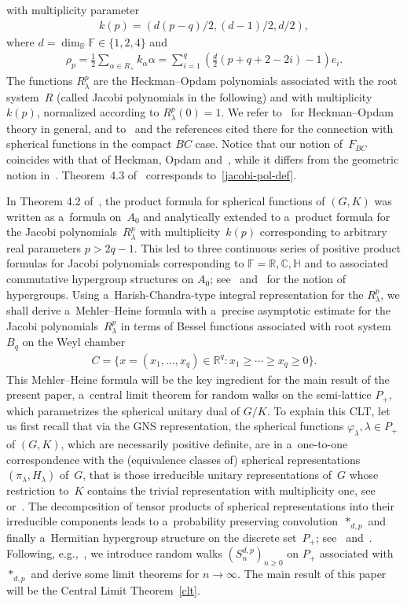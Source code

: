 with multiplicity parameter
\begin{gather}
\label{multipl}
k(p)=(d(p-q)/2, (d-1)/2, d/2),
\end{gather}
where $d=\dim_\mathbb R \mathbb F \in \{1,2,4\}$ and
\begin{gather*}
\rho_p=\frac{1}{2}\sum\limits_{\alpha\in R_+} k_\alpha\alpha=\sum\limits_{i=1}^q \left(\frac{d}{2}(p+q+2-2i) -1\right)e_i.
\end{gather*}
The functions $R_\lambda^p$ are the Heckman--Opdam polynomials associated with the root system~$R$ (called Jacobi
polynomials in the following) and with multiplicity $k(p)$, normalized according to $R_\lambda^p(0)=1$.
We refer to~\cite{H,HS,O1} for Heckman--Opdam theory in general, and to~\cite{RR} and the references
cited there for the connection with spherical functions in the compact $BC$ case.
Notice that our notion of~$F_{BC}$ coincides with that of Heckman, Opdam and~\cite{R2,RV2}, while it dif\/fers
from the geometric notion in~\cite{RR}.
Theorem~4.3 of~\cite{RR} corresponds to~\eqref{jacobi-pol-def}.

In Theorem 4.2 of~\cite{RR}, the product formula for spherical functions of $(G,K)$ was written as a~formula on~$A_0$
and analytically extended to a~product formula for the Jacobi polyno\-mials~$R_\lambda^p$ with multiplicity~$k(p)$
corresponding to arbitrary real parameters $p>2q-1$.
This led to three continuous series of positive product formulas for Jacobi polynomials corresponding to $\mathbb
F=\mathbb R, \mathbb C, \mathbb H$ and to associated commutative hypergroup structures on $A_0$; see~\cite{J}
and~\cite{BH} for the notion of hypergroups.
Using a~Harish-Chandra-type integral representation for the $R_\lambda^p$, we shall derive a~Mehler--Heine formula with
a~precise asymptotic estimate for the Jacobi polyno\-mials~$R_{\lambda}^p$ in terms of Bessel functions associated with
root system $B_q$ on the Weyl chamber
\begin{gather*}
C=\{x= (x_1, \ldots, x_q) \in \mathbb R^q: x_1 \geq \cdots \geq x_q \geq 0\}.
\end{gather*}
This Mehler--Heine formula will be the key ingredient for the main result of the present paper, a~central limit theorem
for random walks on the semi-lattice $P_+$, which parametrizes the spherical unitary dual of $G/K$.
To explain this CLT, let us f\/irst recall that via the GNS representation, the spherical functions $\varphi_\lambda,
\lambda \in P_+$ of $(G,K)$, which are necessarily positive def\/inite, are in a~one-to-one correspondence with the
(equivalence classes of) spherical representations $(\pi_\lambda,H_\lambda)$ of~$G$, that is those irreducible unitary
representations of~$G$ whose restriction to~$K$ contains the trivial representation with multiplicity one, see~\cite{F}
or~\cite[Chapter~IV]{Hel}.
The decomposition of tensor products of spherical representations into their irreducible components leads to
a~probability preserving convolution~$*_{d,p}$ and f\/inally a~Hermitian hypergroup structure on the discrete set~$P_+$;
see~\cite{Du} and~\cite{K3}.
Following, e.g.,~\cite{BH,V1,Z}, we introduce random walks $(S_n^{d,p})_{n\ge0}$ on $P_+$ associated
with $*_{d,p}$ and derive some limit theorems for $n\to\infty$.
The main result of this paper will be the Central Limit Theorem~\ref{clt}.
